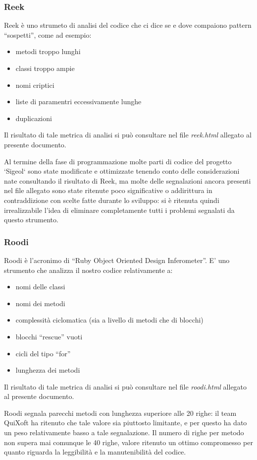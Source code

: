 \documentclass[11pt,a4paper]{article}
\begin{document}
\subsubsection{Reek}
Reek è uno strumeto di analisi del codice che ci dice se e dove compaiono pattern “sospetti”, come ad esempio:
\begin{itemize}
 \item metodi troppo lunghi
 \item classi troppo ampie
 \item nomi criptici
 \item liste di paramentri eccessivamente lunghe
 \item duplicazioni
\end{itemize}
Il risultato di tale metrica di analisi si può consultare nel file \textit{reek.html} allegato al presente documento.

Al termine della fase di programmazione molte parti di codice del progetto `Sigeol` sono state modificate e ottimizzate tenendo conto delle considerazioni nate consultando il risultato di Reek, ma molte delle segnalazioni ancora presenti nel file allegato sono state ritenute poco significative o addirittura in contraddizione con scelte fatte durante lo sviluppo: si è ritenuta quindi irrealizzabile l'idea di eliminare completamente tutti i problemi segnalati da questo strumento.
\subsubsection{Roodi}
Roodi è l’acronimo di “Ruby Object Oriented Design Inferometer”. E’ uno strumento che analizza il nostro codice relativamente a:
\begin{itemize}
 \item nomi delle classi
 \item nomi dei metodi
 \item complessità ciclomatica (sia a livello di metodi che di blocchi)
 \item blocchi “rescue” vuoti
 \item cicli del tipo “for”
 \item lunghezza dei metodi
\end{itemize}
Il risultato di tale metrica di analisi si può consultare nel file \textit{roodi.html} allegato al presente documento.

Roodi segnala parecchi metodi con lunghezza superiore alle 20 righe: il team QuiXoft ha ritenuto che tale valore sia piuttosto limitante, e per questo ha dato un peso relativamente basso a tale segnalazione. Il numero di righe per metodo non supera mai comunque le 40 righe, valore ritenuto un ottimo compromesso per quanto riguarda la leggibilità e la manutenibilità del codice.
\end{document}
